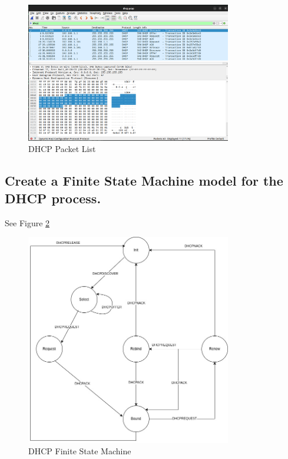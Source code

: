 \documentclass{article}
\begin{document}
\begin{figure}[h]
    \centering
    \includegraphics[width=0.8\textwidth]{task2/dhcp_wireshark.png}
    \caption{DHCP Packet List}
    \label{fig:pcap_dhcp}
\end{figure}

\subsection{Create a Finite State Machine model for the DHCP process.}
 
See Figure \ref{fig:dhcp_fsm}

\begin{figure}[h]
    \centering
    \includegraphics[width=0.8\textwidth]{task2/DHCP_FSM.jpg}
    \caption{DHCP Finite State Machine}
    \label{fig:dhcp_fsm}
\end{figure}
\end{document}
